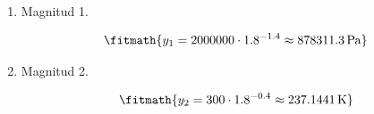\begin{enumerate}

\item Magnitud 1.

\[\fitmath{y_{1}=2000000\cdot {1.8}^{-1.4}\approx 878311.3\,\mathrm{Pa}}\]

\item Magnitud 2.

\[\fitmath{y_{2}=300\cdot {1.8}^{-0.4}\approx 237.1441\,\mathrm{K}}\]

\end{enumerate}
